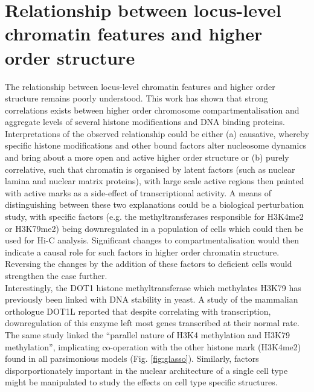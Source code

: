 \documentclass[a4paper]{report}
\begin{document}
\section{ Relationship between locus-level chromatin features and higher
order structure} 
The relationship between locus-level chromatin features and higher
order structure remains poorly understood. This work has shown that strong correlations exists between higher order chromosome 
compartmentalisation and aggregate levels of several histone
modifications and DNA binding proteins. \\

Interpretations of the
observed relationship could be either (a) causative, 
whereby specific histone modifications and other bound factors alter nucleosome dynamics and
bring about a more open and active higher order structure or (b)
purely correlative, such that chromatin is organised by latent factors
(such as 
nuclear lamina and nuclear matrix proteins), with large scale active
regions then painted with active marks as a side-effect of
transcriptional activity.\cite{Henikoff2011} A means of distinguishing between these two
explanations could be a biological perturbation study, with specific
factors (e.g. the methyltransferases responsible for H3K4me2 or
H3K79me2) being downregulated in a population of cells
which could then be used for Hi-C analysis. Significant changes to
compartmentalisation would then indicate a causal role for such
factors 
in higher order chromatin structure. Reversing the changes by the addition of these factors to deficient cells would strengthen the case further. \\

Interestingly, the DOT1 histone methyltransferase which methylates H3K79 has
previously been linked with DNA stability in yeast.\cite{Wysocki2005}
A study of the mammalian orthologue DOT1L reported that despite
correlating with transcription, downregulation of this enzyme left most genes
transcribed at their normal rate.\cite{Steger2008a} The same study
linked the ``parallel nature of H3K4 methylation and H3K79
methylation'',\cite{Steger2008a} implicating co-operation with the
other histone mark (H3K4me2) found in all parsimonious models
(Fig. \ref{fig:glasso}). Similarly, factors disporportionately important in the nuclear architecture of a single cell type might be manipulated to study the effects on cell type specific structures.

\end{document}
